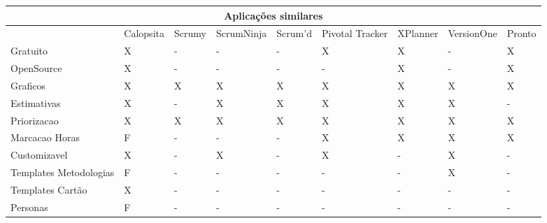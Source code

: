 \begin{sidewaystable}
	\begin{tabular}{|l|l|l|l|l|l|l|l|l|}
		\hline
		\multicolumn{9}{|c|}{Aplicações similares} \\
		\hline
		 & Calopsita & Scrumy & ScrumNinja & Scrum'd & Pivotal Tracker & XPlanner & VersionOne & Pronto \\
		Gratuito & X & - & - & - & X & X & - & X \\
		OpenSource & X & - & - & - & - & X & - & X \\
		Graficos & X & X & X & X & X & X & X & X \\
		Estimativas & X & - & X & X & X & X & X & - \\
		Priorizacao & X & X & X & X & X & X & X & X \\
		Marcacao Horas & F & - & - & - & X & X & X & X \\
		Customizavel & X & - & X & - & X & - & X & - \\
		Templates Metodologias & F & - & - & - & - & - & X & - \\
		Templates Cartão & X & - & - & - & - & - & - & - \\
		Personas & F & - & - & - & - & - & - & - \\
		\hline
	\end{tabular}
\end{sidewaystable}



